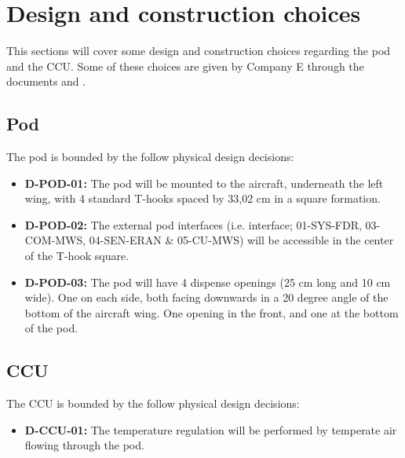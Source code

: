 \section{Design and construction choices}
This sections will cover some design and construction choices regarding the pod and the CCU.
Some of these choices are given by Company E through the documents \pcsow \space and \momPrimeOne.

\subsection{Pod}
The pod is bounded by the follow physical design decisions:
\begin{itemize}
    \item \textbf{D-POD-01:} The pod will be mounted to the aircraft, underneath the left wing, with 4 standard T-hooks spaced by 33,02 cm in a square formation.
    \item \textbf{D-POD-02:} The external pod interfaces (i.e. interface; 01-SYS-FDR, 03-COM-MWS, 04-SEN-ERAN \& 05-CU-MWS) will be accessible in the center of the T-hook square.
    \item \textbf{D-POD-03:} The pod will have 4 dispense openings (25 cm long and 10 cm wide). One on each side, both facing downwards in a 20 degree angle of the bottom of the aircraft wing. One opening in the front, and one at the bottom of the pod.
\end{itemize}

\subsection{CCU}
The CCU is bounded by the follow physical design decisions:
\begin{itemize}
    \item \textbf{D-CCU-01:} The temperature regulation will be performed by temperate air flowing through the pod.
\end{itemize}